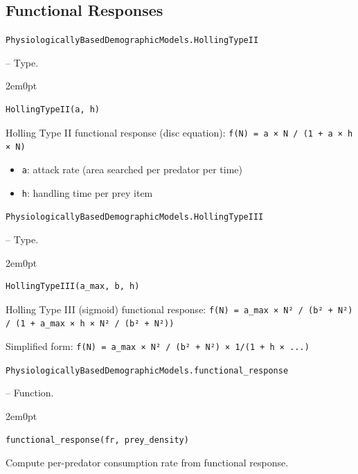 \label{10856533068520177834}{}


\subsection{Functional Responses}



\label{11072207086526640619}{}

\hypertarget{13783516271547822388}{\texttt{PhysiologicallyBasedDemographicModels.HollingTypeII}}  -- {Type.}

\begin{adjustwidth}{2em}{0pt}


\begin{verbatim}
HollingTypeII(a, h)
\end{verbatim}

Holling Type II functional response (disc equation): \texttt{f(N) = a × N / (1 + a × h × N)}

\begin{itemize}
\item \texttt{a}: attack rate (area searched per predator per time)


\item \texttt{h}: handling time per prey item

\end{itemize}


\end{adjustwidth}
\hypertarget{9901639622162576351}{\texttt{PhysiologicallyBasedDemographicModels.HollingTypeIII}}  -- {Type.}

\begin{adjustwidth}{2em}{0pt}


\begin{verbatim}
HollingTypeIII(a_max, b, h)
\end{verbatim}

Holling Type III (sigmoid) functional response: \texttt{f(N) = a\_max × N² / (b² + N²) / (1 + a\_max × h × N² / (b² + N²))}

Simplified form: \texttt{f(N) = a\_max × N² / (b² + N²) × 1/(1 + h × ...)}



\end{adjustwidth}
\hypertarget{6751578554632618275}{\texttt{PhysiologicallyBasedDemographicModels.functional\_response}}  -- {Function.}

\begin{adjustwidth}{2em}{0pt}


\begin{verbatim}
functional_response(fr, prey_density)
\end{verbatim}

Compute per-predator consumption rate from functional response.



\end{adjustwidth}

